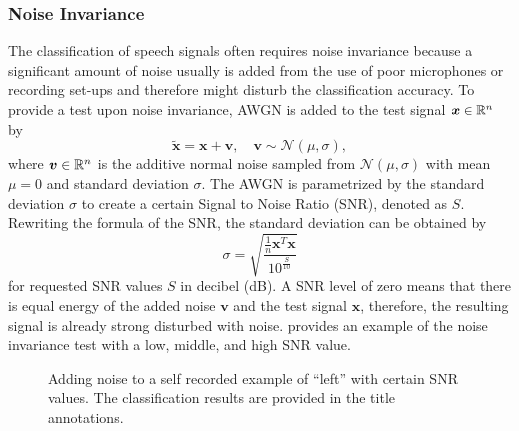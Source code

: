 \subsubsection{Noise Invariance}
The classification of speech signals often requires noise invariance because a significant amount of noise usually is added from the use of poor microphones or recording set-ups and therefore might disturb the classification accuracy.
To provide a test upon noise invariance, AWGN is added to the test signal $\bm{x} \in \mathbb{R}^n$ by
\begin{equation}
  \bm{\tilde{x}} = \bm{x} + \bm{v}, \quad \bm{v} \sim \mathcal{N}(\mu, \sigma),
\end{equation}
where $\bm{v} \in \mathbb{R}^n$ is the additive normal noise sampled from $\mathcal{N}(\mu, \sigma)$ with mean $\mu = 0$ and standard deviation $\sigma$.
The AWGN is parametrized by the standard deviation $\sigma$ to create a certain Signal to Noise Ratio (SNR), denoted as $S$.
Rewriting the formula of the SNR, the standard deviation can be obtained by
\begin{equation}
  \sigma = \sqrt{\frac{\frac{1}{n}\bm{x}^T \bm{x}}{10^{\frac{S}{10}}}}
\end{equation}
for requested SNR values $S$ in decibel (dB).
A SNR level of zero means that there is equal energy of the added noise $\bm{v}$ and the test signal $\bm{x}$, therefore, the resulting signal is already strong disturbed with noise.
 provides an example of the noise invariance test with a low, middle, and high SNR value.
\begin{figure}[!ht]
  \centering
    \quad
  \caption{Adding noise to a self recorded example of \enquote{left} with certain SNR values. The classification results are provided in the title annotations.}
  \label{fig:exp_details_tb_noise_left}
\end{figure}
